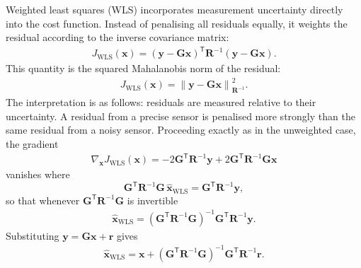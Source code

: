 \documentclass[11pt,oneside,openany]{book}
\begin{document}
Weighted least squares (WLS) incorporates measurement uncertainty directly into the cost function. Instead of penalising all residuals equally, it weights the residual according to the inverse covariance matrix:
\begin{align}
J_{\mathrm{WLS}}(\mathbf{x}) = \left( \mathbf{y} - \mathbf{G}\mathbf{x} \right)^{\mathsf T} \mathbf{R}^{-1} \left( \mathbf{y} - \mathbf{G}\mathbf{x} \right).
\end{align}
This quantity is the squared Mahalanobis norm of the residual:
\begin{align}
J_{\mathrm{WLS}}(\mathbf{x}) = \left\| \mathbf{y} - \mathbf{G}\mathbf{x} \right\|_{\mathbf{R}^{-1}}^2.
\end{align}
The interpretation is as follows: residuals are measured relative to their uncertainty. A residual from a precise sensor is penalised more strongly than the same residual from a noisy sensor. 
Proceeding exactly as in the unweighted case, the gradient
\begin{align}
\nabla_{\mathbf{x}}
J_{\mathrm{WLS}}(\mathbf{x}) = -2 \mathbf{G}^{\mathsf T} \mathbf{R}^{-1} \mathbf{y} + 2 \mathbf{G}^{\mathsf T} \mathbf{R}^{-1} \mathbf{G} \mathbf{x}
\end{align}
vanishes where $$\mathbf{G}^{\mathsf T}\mathbf{R}^{-1}\mathbf{G}\,\widehat{\mathbf{x}}_{\mathrm{WLS}}=\mathbf{G}^{\mathsf T}\mathbf{R}^{-1}\mathbf{y},$$ so that whenever $\mathbf{G}^{\mathsf T}\mathbf{R}^{-1}\mathbf{G}$ is invertible
\begin{align}
\widehat{\mathbf{x}}_{\mathrm{WLS}}
=
\left(
\mathbf{G}^{\mathsf T}
\mathbf{R}^{-1}
\mathbf{G}
\right)^{-1}
\mathbf{G}^{\mathsf T}
\mathbf{R}^{-1}
\mathbf{y}.
\end{align}
Substituting $\mathbf{y}=\mathbf{G}\mathbf{x}+\mathbf{r}$ gives
\begin{align}
\widehat{\mathbf{x}}_{\mathrm{WLS}}
=
\mathbf{x}
+
\left(
\mathbf{G}^{\mathsf T}
\mathbf{R}^{-1}
\mathbf{G}
\right)^{-1}
\mathbf{G}^{\mathsf T}
\mathbf{R}^{-1}
\mathbf{r}.
\end{align}
\end{document}
